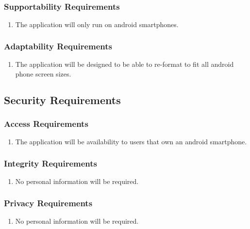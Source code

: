 \documentclass[12pt, titlepage]{article}
\begin{document}
\subsubsection{Supportability Requirements}
\label{ssub:supportability_requirements}
\begin{enumerate}[{MS}1. ]
	\item The application will only run on android smartphones.
\end{enumerate}

\subsubsection{Adaptability Requirements}
\label{ssub:adaptability_requirements}
\begin{enumerate}[{MS}1. ]
	\item The application will be designed to be able to re-format to fit all android phone screen sizes.
\end{enumerate}


\subsection{Security Requirements}
\label{sub:security_requirements}

\subsubsection{Access Requirements}
\label{ssub:access_requirements}
\begin{enumerate}[{SR}1. ]
	\item The application will be availability to users that own an android smartphone.
\end{enumerate}

\subsubsection{Integrity Requirements}
\label{ssub:integrity_requirements}
\begin{enumerate}[{SR}1. ]
	\item No personal information will be required.
\end{enumerate}

\subsubsection{Privacy Requirements}
\label{ssub:privacy_requirements}
\begin{enumerate}[{SR}1. ]
	\item No personal information will be required.
\end{enumerate}
\end{document}
